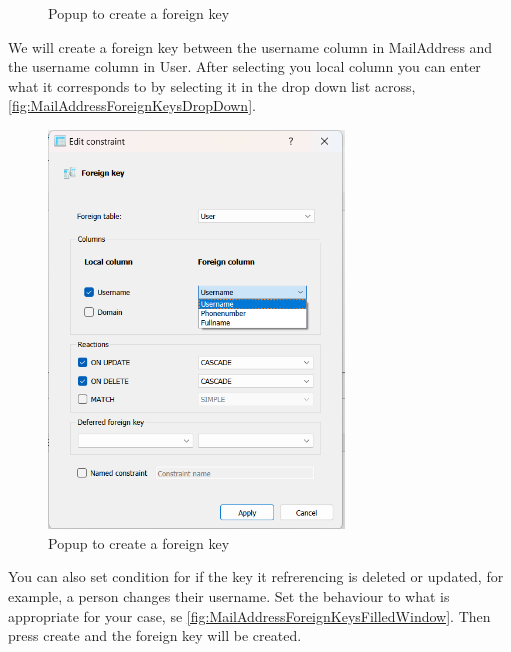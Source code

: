 \documentclass[a4paper,11pt,oneside]{article}
\begin{document}
\begin{sloppypar}
\begin{figure}[!htb]
  \caption{Popup to create a foreign key}
  \label{fig:MailAddressForeignKeysBlankWindow}
\end{figure}
We will create a foreign key between the username column in MailAddress and the username column in User. After selecting you local column you can enter what it corresponds to by selecting it in the drop down list across, \autoref{fig:MailAddressForeignKeysDropDown}. 
\begin{figure}[!htb]
  \centering
  \includegraphics[width=0.7\textwidth]{sqlitestudio/create_foreign_key/foreign_key_dropdown_menu.png}
  \caption{Popup to create a foreign key}
  \label{fig:MailAddressForeignKeysDropDown}
\end{figure}
You can also set condition for if the key it refrerencing is deleted or updated, for example, a person changes their username. Set the behaviour to what is appropriate for your case, se \autoref{fig:MailAddressForeignKeysFilledWindow}. Then press create and the foreign key will be created.
\begin{figure}[!htb]
  \centering

\end{figure}
\end{sloppypar}
\end{document}

